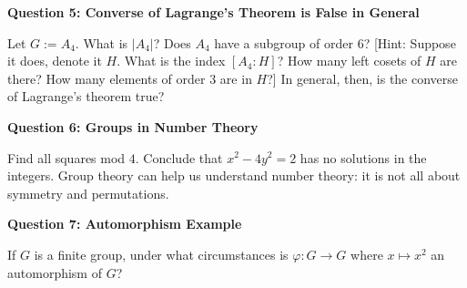\documentclass[11pt,twoside, a4paper]{report}
\theoremstyle{plain}
\theoremstyle{definition}
\begin{document}
  
\begin{center}
{\bf Question 5: Converse of Lagrange's Theorem is False in General}
\end{center}
Let $G:=A_{4}$. What is $|A_{4}|$? Does $A_{4}$ have a subgroup of order 6? [Hint: Suppose it does, denote it $H$. What is the index $[A_{4}:H]$? How many left cosets of $H$ are there? How many elements of order 3 are in $H$?] In general, then, is the converse of Lagrange's theorem true?

  


  
\begin{center}
{\bf Question 6: Groups in Number Theory}
\end{center}

Find all squares mod $4$. Conclude that $x^{2} - 4y^{2} = 2$ has no solutions in the integers. Group theory can help us understand number theory: it is not all about symmetry and permutations. 

  
\begin{center}
{\bf Question 7: Automorphism Example}
\end{center}

If $G$ is a finite group, under what circumstances is $\varphi: G \rightarrow G$ where $x\mapsto x^{2}$ an automorphism of $G$?
\end{document}
